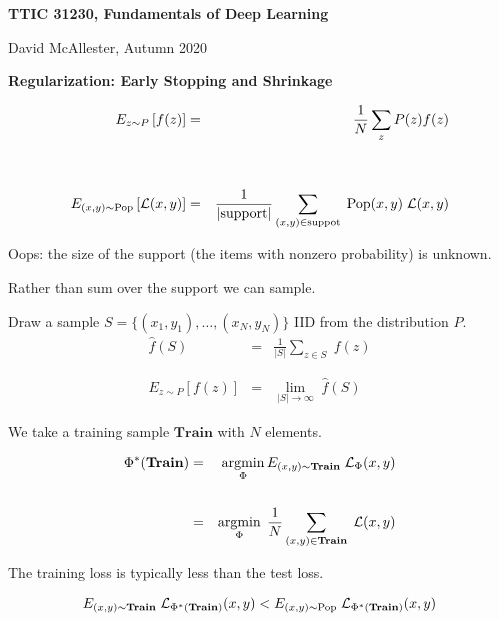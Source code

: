 





{\Huge


\centerline{\bf TTIC 31230, Fundamentals of Deep Learning}
\bigskip
\centerline{David McAllester, Autumn 2020}

\vfill
\centerline{\bf Regularization: Early Stopping and Shrinkage}
\vfill
\vfill


\begin{eqnarray*}
E_{z \sim P}\left[f(z)\right] & = & \frac{1}{N} \sum_z P(z) f(z) \\
\\
\\
E_{(x,y) \sim \mathrm{Pop}}\left[{\cal L}(x,y)\right] &  = & \frac{1}{|\mathrm{support}|}\sum_{(x,y) \in \mathrm{suppot}} \;\mathrm{Pop}(x,y) \;{\cal L}(x,y)
\end{eqnarray*}

\vfill
Oops: the size of the support (the items with nonzero probability) is unknown.


\vfill
Rather than sum over the support we can sample.

\vfill
Draw a sample $S = \{(x_1,y_1),\ldots,(x_N,y_N)\}$ IID from the distribution $P$.
\vfill
\begin{eqnarray*}
\hat{f}(S) & = & \frac{1}{|S|} \sum_{z\in S}\;f(z) \\
\\
\\
E_{z \sim P}\left[f(z)\right] & = & \lim_{|S| \rightarrow \infty}\;\hat{f}(S)
\end{eqnarray*}


We take a training sample $\mathbf{Train}$ with $N$ elements.

\begin{eqnarray*}
\Phi^*(\mathbf{Train}) & = & \operatorname*{argmin}_\Phi E_{(x,y) \sim \mathbf{Train}}\;{\cal L}_\Phi(x,y) \\
\\
& = & \operatorname*{argmin}_\Phi \; \frac{1}{N} \sum_{(x,y)\in \mathbf{Train}}\; {\cal L}(x,y)
\end{eqnarray*}

\vfill
The training loss is typically less than the test loss.

\vfill
$$E_{(x,y) \sim \mathbf{Train}}\;{\cal L}_{\Phi^*(\mathbf{Train})}(x,y) < E_{(x,y) \sim \mathrm{Pop}}\; {\cal L}_{\Phi^*(\mathbf{Train})}(x,y)$$

}
